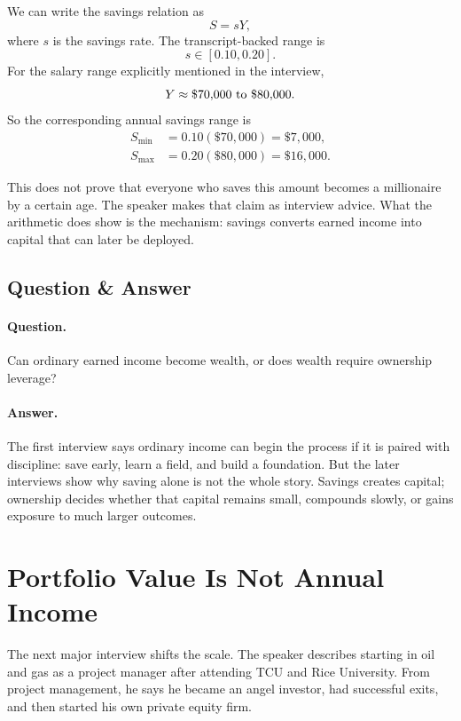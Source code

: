 We can write the savings relation as
\begin{equation}
S=sY,
\end{equation}
where \(s\) is the savings rate. The transcript-backed range is
\begin{equation}
s\in[0.10,0.20].
\end{equation}
For the salary range explicitly mentioned in the interview,
\begin{equation}
Y\approx \$70{,}000 \hbox{ to } \$80{,}000.
\end{equation}
So the corresponding annual savings range is
\begin{align}
S_{\min} &=0.10(\$70{,}000)=\$7{,}000,\\
S_{\max} &=0.20(\$80{,}000)=\$16{,}000.
\end{align}

This does not prove that everyone who saves this amount becomes a millionaire by a certain age. The speaker makes that claim as interview advice. What the arithmetic does show is the mechanism: savings converts earned income into capital that can later be deployed.

\subsection{Question \& Answer}

\paragraph{Question.}
Can ordinary earned income become wealth, or does wealth require ownership leverage?

\paragraph{Answer.}
The first interview says ordinary income can begin the process if it is paired with discipline: save early, learn a field, and build a foundation. But the later interviews show why saving alone is not the whole story. Savings creates capital; ownership decides whether that capital remains small, compounds slowly, or gains exposure to much larger outcomes.

\section{Portfolio Value Is Not Annual Income}

The next major interview shifts the scale. The speaker describes starting in oil and gas as a project manager after attending TCU and Rice University. From project management, he says he became an angel investor, had successful exits, and then started his own private equity firm.

